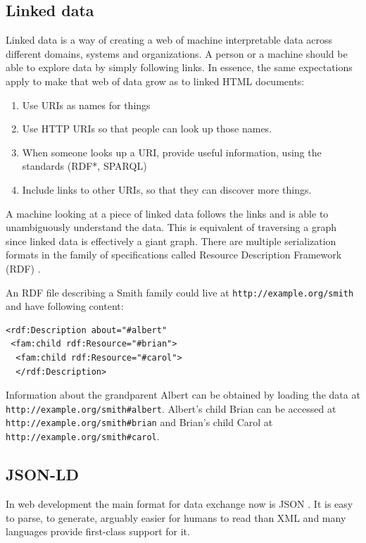 \subsection{Linked data}\label{linkeddata}
Linked data is a way of creating a web of machine interpretable data across different domains, systems and organizations. A person or a machine should be able to explore data by simply following links. In essence, the same expectations apply to make that web of data grow as to linked HTML documents: \citep{linkedatafourrules}

\begin{enumerate}
  \item Use URIs as names for things
  \item Use HTTP URIs so that people can look up those names.
  \item When someone looks up a URI, provide useful information, using the standards (RDF*, SPARQL)
  \item Include links to other URIs, so that they can discover more things.
\end{enumerate}

A machine looking at a piece of linked data follows the links and is able to unambiguously understand the data. This is equivalent of traversing a graph since linked data is effectively a giant graph. There are multiple serialization formats in the family of specifications called Resource Description Framework (RDF) \citep{rdfspecification}.

An RDF file describing a Smith family could live at \lstinline{http://example.org/smith} and have following content:

\lstset{language=XML}
\begin{lstlisting}[caption= Simple example of a person as RDF, label=rdfexample]
<rdf:Description about="#albert"
 <fam:child rdf:Resource="#brian">
  <fam:child rdf:Resource="#carol">
  </rdf:Description>
\end{lstlisting}

Information about the grandparent Albert can be obtained by loading the data at \\ \lstinline{http://example.org/smith#albert}. Albert's child Brian can be accessed at \\  \lstinline{http://example.org/smith#brian} and Brian's child Carol at \lstinline{http://example.org/smith#carol}.

\subsection{JSON-LD}\label{jsonld}
In web development the main format for data exchange now is JSON \citep{jsonformat}. It is easy to parse, to generate, arguably easier for humans to read than XML and many languages provide first-class support for it.

